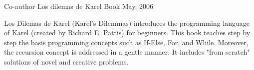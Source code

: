 

\begin{cventries}

  \cventry
    {Co-author} %
    {Los dilemas de Karel} %
    {Book} %
    {May. 2006} %
    {}
    {
      \begin{cvitems} %
        \item {Los Dilemas de Karel (Karel's Dilemmas) introduces the programming language of Karel (created by Richard E. Pattis) for beginners. This book teaches step by step the basis programming concepts such as If-Else, For, and While. 
        Moreover, the recursion concept is addressed in a gentle manner. It includes "from scratch" solutions of novel and creative problems.}
      \end{cvitems}
    }

\end{cventries}
